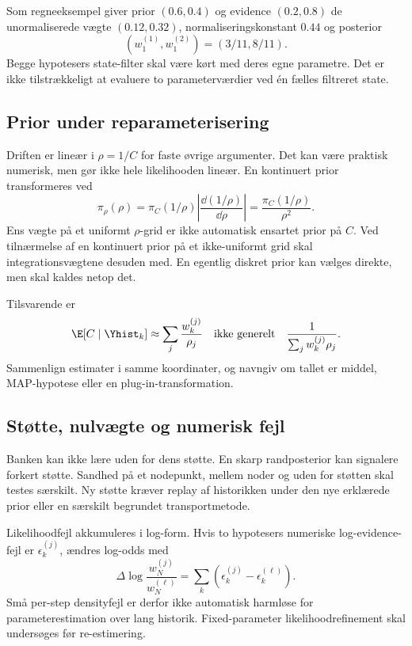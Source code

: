 Som regneeksempel giver prior \((0.6,0.4)\) og evidence \((0.2,0.8)\) de unormaliserede vægte \((0.12,0.32)\), normaliseringskonstant \(0.44\) og posterior
\[
 (w_1^{(1)},w_1^{(2)})=(3/11,8/11).
\]
Begge hypotesers state-filter skal være kørt med deres egne parametre. Det er ikke tilstrækkeligt at evaluere to parameterværdier ved én fælles filtreret state.

\subsection{Prior under reparameterisering}
Driften er lineær i \(\rho=1/C\) for faste øvrige argumenter. Det kan være praktisk numerisk, men gør ikke hele likelihooden lineær. En kontinuert prior transformeres ved
\begin{equation}
 \pi_\rho(\rho)=\pi_C(1/\rho)\left|\frac{\dd (1/\rho)}{\dd\rho}\right|
 =\frac{\pi_C(1/\rho)}{\rho^2}.
 \label{eq:priortransform}
\end{equation}
Ens vægte på et uniformt \(\rho\)-grid er ikke automatisk ensartet prior på \(C\). Ved tilnærmelse af en kontinuert prior på et ikke-uniformt grid skal integrationsvægtene desuden med. En egentlig diskret prior kan vælges direkte, men skal kaldes netop det.

Tilsvarende er
\begin{equation}
 \E[C\mid\Yhist_k]\approx\sum_j\frac{w_k^{(j)}}{\rho_j}
 \quad\text{ikke generelt}\quad
 \frac1{\sum_jw_k^{(j)}\rho_j}.
 \label{eq:mean_capacity}
\end{equation}
Sammenlign estimater i samme koordinater, og navngiv om tallet er middel, MAP-hypotese eller en plug-in-transformation.

\subsection{Støtte, nulvægte og numerisk fejl}
Banken kan ikke lære uden for dens støtte. En skarp randposterior kan signalere forkert støtte. Sandhed på et nodepunkt, mellem noder og uden for støtten skal testes særskilt. Ny støtte kræver replay af historikken under den nye erklærede prior eller en særskilt begrundet transportmetode.

Likelihoodfejl akkumuleres i log-form. Hvis to hypotesers numeriske log-evidence-fejl er \(\epsilon_k^{(j)}\), ændres log-odds med
\begin{equation}
 \Delta\log\frac{w_N^{(j)}}{w_N^{(\ell)}}
 =\sum_k\left(\epsilon_k^{(j)}-\epsilon_k^{(\ell)}\right).
 \label{eq:logoddserror}
\end{equation}
Små per-step densityfejl er derfor ikke automatisk harmløse for parameterestimation over lang historik. Fixed-parameter likelihoodrefinement skal undersøges før re-estimering.

